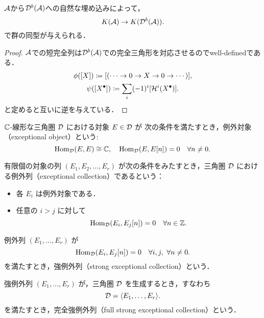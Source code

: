 \begin{prop}\cite{KS06}
	${\mathcal A}$から${\mathcal D}^b({\mathcal A})$への自然な埋め込みによって，
	\[K({\mathcal A})\rightarrow K({\mathcal D}^b({\mathcal A})).\]
	で群の同型が与えられる．
\end{prop}
\begin{proof}
	${\mathcal A}$での短完全列は${\mathcal D}^b({\mathcal A})$での完全三角形を対応させるのでwell-definedである．\\
	\begin{gather*}
		\phi([X])\coloneq [(\cdots\rightarrow 0\rightarrow X\rightarrow 0\rightarrow \cdots)],\\
		\psi([X^\bullet])\coloneq \sum_i(-1)^i[{\mathcal H}^i(X^\bullet)].
	\end{gather*}
	と定めると互いに逆を与えている．
\end{proof}

\begin{defn}[例外対象]\cite{BK89}
\label{defn:exceptional object}
${\mathbb C}$-線形な三角圏 \( {\mathcal D} \) における対象 \( E \in {\mathcal D} \) が 次の条件を満たすとき，例外対象（exceptional object）という:
\[
\operatorname{\mathrm{Hom}}_{{\mathcal D}}(E, E) \cong {\mathbb C}, \quad \operatorname{\mathrm{Hom}}_{{\mathcal D}}(E, E[n]) = 0 \quad \forall n \ne 0.
\]
\end{defn}

\begin{defn}[例外列]\cite{BK89}
\label{defn:exceptional collection}
有限個の対象の列 \( (E_1, E_2, \dots, E_r) \) が次の条件をみたすとき，三角圏 \( {\mathcal D} \) における例外列（exceptional collection）であるという：
\begin{itemize}
  \item 各 \( E_i \) は例外対象である．
  \item 任意の \( i > j \) に対して
  \[
  \operatorname{\mathrm{Hom}}_{{\mathcal D}}(E_i, E_j[n]) = 0 \quad  \forall n \in {\mathbb Z}.
  \]
\end{itemize}
\end{defn}

\begin{defn}[強例外列]\cite{BK89}
\label{defn:strong exceptional collection}
例外列 \( (E_1, \dots, E_r) \) が
\[\operatorname{\mathrm{Hom}}_{{\mathcal D}}(E_i, E_j[n]) = 0 \quad \forall i, j ,\ \forall n \ne 0.\]
 を満たすとき，強例外列（strong exceptional collection）という．
\end{defn}

\begin{defn}[完全強例外列]\cite{BK89}
\label{defn:full strong exceptional collection}
強例外列 \( (E_1, \dots, E_r) \) が，三角圏 \( {\mathcal D} \) を生成するとき，すなわち
\[
{\mathcal D} = \langle E_1, \dots, E_r \rangle .
\]
を満たすとき，完全強例外列（full strong exceptional collection）という．
\end{defn}

